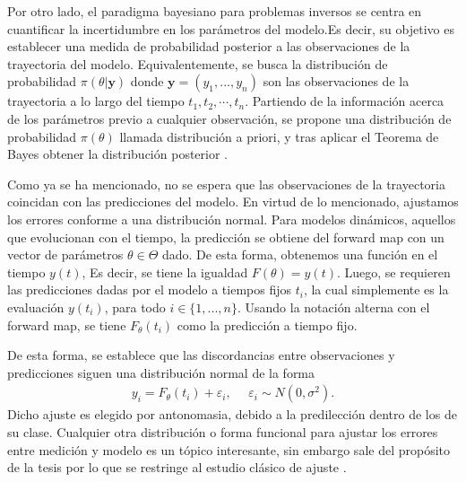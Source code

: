 Por otro lado, el paradigma bayesiano para problemas inversos se centra en cuantificar la incertidumbre en los parámetros del modelo.Es decir, su objetivo es establecer una medida de probabilidad posterior a las observaciones de la trayectoria del modelo. Equivalentemente, se busca la distribución de probabilidad $\pi(\theta|\mathbf{y})$ donde $\mathbf{y} = (y_1,...,y_n)$ son las observaciones de la trayectoria a lo largo del tiempo $t_1, t_2, \cdots, t_n$. Partiendo de la información acerca de los parámetros previo a cualquier observación, se propone una distribución de probabilidad $\pi(\theta)$ llamada distribución a priori, y tras aplicar el Teorema de Bayes obtener la distribución posterior \cite{wasserman2013all}.

Como ya se ha mencionado, no se espera que las observaciones de la trayectoria coincidan con las predicciones del modelo. En virtud de lo mencionado, ajustamos los errores conforme a una distribución normal. Para modelos dinámicos, aquellos que evolucionan con el tiempo, la predicción se obtiene del forward map con un vector de parámetros $\theta \in \Theta$ dado.
De esta forma, obtenemos una función en el tiempo $y(t)$, Es decir, se tiene la igualdad $F(\theta) = y(t)$. Luego, se requieren las predicciones dadas por el modelo a tiempos fijos $t_i$, la cual simplemente es la evaluación $y(t_i)$, para todo $i \in \{1,...,n\}$. Usando la notación alterna con el forward map, se tiene $F_{\theta}(t_i)$ como la predicción a tiempo fijo.

De esta forma, se establece que las discordancias entre observaciones y predicciones siguen una distribución normal de la forma
\begin{align*}
    y_i = F_{\theta} (t_i) + \varepsilon_i, \:\:\:\:\:\: \varepsilon_i \sim N(0,\sigma^2).
\end{align*}
Dicho ajuste es elegido por antonomasia, debido a la predilección  dentro de los de su clase. Cualquier otra distribución o forma funcional para ajustar los errores entre medición y modelo es un tópico interesante, sin embargo sale del propósito de la tesis por lo que se restringe al estudio clásico de ajuste \cite{berger2013statistical}.

